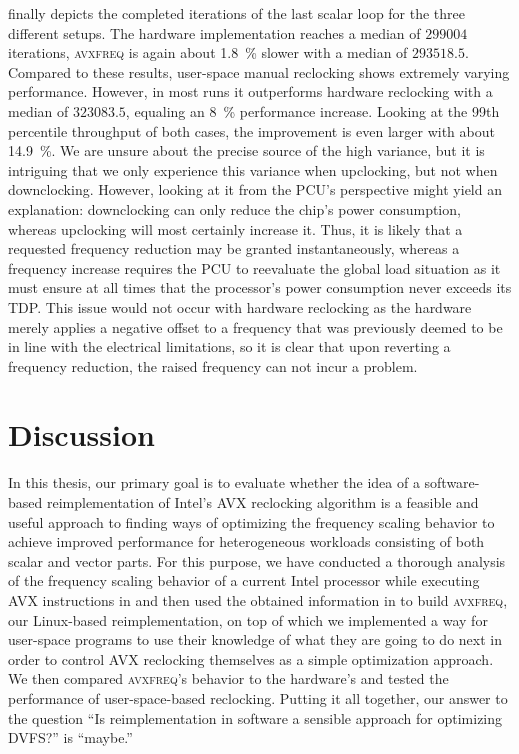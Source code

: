 finally depicts the completed iterations of the last scalar loop for the three different setups. The hardware implementation reaches a median of $299004$ iterations, \textsc{avxfreq} is again about \SI{1.8}{\percent} slower with a median of $293518.5$. Compared to these results, user-space manual reclocking shows extremely varying performance. However, in most runs it outperforms hardware reclocking with a median of $323083.5$, equaling an \SI{8}{\percent} performance increase. Looking at the 99th percentile throughput of both cases, the improvement is even larger with about \SI{14.9}{\percent}. We are unsure about the precise source of the high variance, but it is intriguing that we only experience this variance when upclocking, but not when downclocking. However, looking at it from the \gls{PCU}'s perspective might yield an explanation: downclocking can only reduce the chip's power consumption, whereas upclocking will most certainly increase it. Thus, it is likely that a requested frequency reduction may be granted instantaneously, whereas a frequency increase requires the \gls{PCU} to reevaluate the global load situation as it must ensure at all times that the processor's power consumption never exceeds its \gls{TDP}. This issue would not occur with hardware reclocking as the hardware merely applies a negative offset to a frequency that was previously deemed to be in line with the electrical limitations, so it is clear that upon reverting a frequency reduction, the raised frequency can not incur a problem.

\section{Discussion}
\label{sec:evaluation:discussion}

In this thesis, our primary goal is to evaluate whether the idea of a software-based reimplementation of Intel's \gls{AVX} reclocking algorithm is a feasible and useful approach to finding ways of optimizing the frequency scaling behavior to achieve improved performance for heterogeneous workloads consisting of both scalar and vector parts. For this purpose, we have conducted a thorough analysis of the frequency scaling behavior of a current Intel processor while executing \gls{AVX} instructions in  and then used the obtained information in  to build \textsc{avxfreq}, our \gls{Linux}-based reimplementation, on top of which we implemented a way for user-space programs to use their knowledge of what they are going to do next in order to control \gls{AVX} reclocking themselves as a simple optimization approach. We then compared \textsc{avxfreq}'s behavior to the hardware's and tested the performance of user-space-based reclocking. Putting it all together, our answer to the question \enquote{Is reimplementation in software a sensible approach for optimizing \gls{DVFS}?} is \enquote{maybe.}

